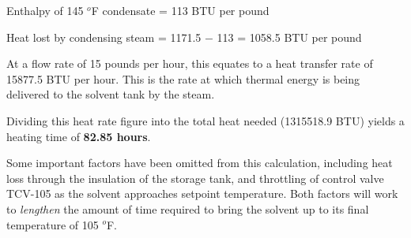 Enthalpy of 145 $^{o}$F condensate = 113 BTU per pound 

\vskip 10pt

Heat lost by condensing steam = 1171.5 $-$ 113 = 1058.5 BTU per pound

\vskip 10pt

At a flow rate of 15 pounds per hour, this equates to a heat transfer rate of 15877.5 BTU per hour.  This is the rate at which thermal energy is being delivered to the solvent tank by the steam.

\vskip 10pt

Dividing this heat rate figure into the total heat needed (1315518.9 BTU) yields a heating time of {\bf 82.85 hours}.

\vskip 10pt

Some important factors have been omitted from this calculation, including heat loss through the insulation of the storage tank, and throttling of control valve TCV-105 as the solvent approaches setpoint temperature.  Both factors will work to {\it lengthen} the amount of time required to bring the solvent up to its final temperature of 105 $^{o}$F.




